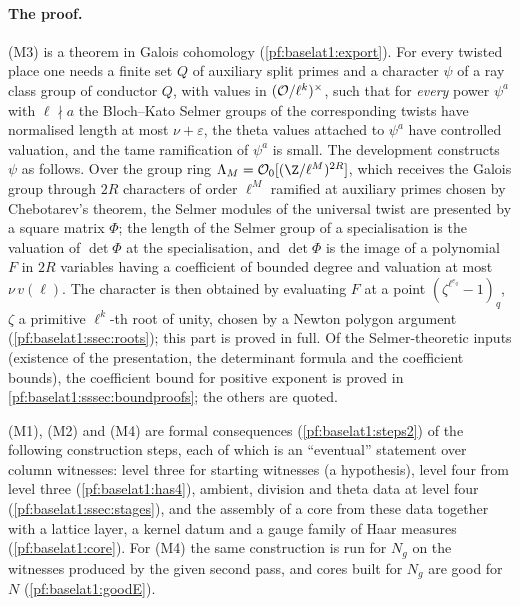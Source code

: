 \paragraph{The proof.} (M3) is a theorem in Galois cohomology (\cref{pf:baselat1:export}). For every
twisted place one needs a finite set $Q$ of auxiliary split primes and a character $\psi$ of a ray class
group of conductor $Q$, with values in $(\mathcal O/\ell^{k})^\times$, such that for \emph{every} power
$\psi^a$ with $\ell\nmid a$ the Bloch--Kato Selmer groups of the corresponding twists have normalised
length at most $\nu+\varepsilon$, the theta values attached to $\psi^a$ have controlled valuation, and the
tame ramification of $\psi^a$ is small. The development constructs $\psi$ as follows. Over the group ring
$\baselatoneLam_M=\baselatoneO_0[(\Z/\ell^M)^{2R}]$, which receives the Galois group through $2R$
characters of order $\ell^M$ ramified at auxiliary primes chosen by Chebotarev's theorem, the Selmer
modules of the universal twist are presented by a square matrix $\Phi$; the length of the Selmer group of a
specialisation is the valuation of $\det\Phi$ at the specialisation, and $\det\Phi$ is the image of a
polynomial $F$ in $2R$ variables having a coefficient of bounded degree and valuation at most
$\nu\, v(\ell)$. The character is then obtained by evaluating $F$ at a
point $(\zeta^{\ell^{e_q}}-1)_q$, $\zeta$ a primitive $\ell^k$-th root of unity, chosen by a Newton polygon
argument (\cref{pf:baselat1:ssec:roots}); this part is proved in full. Of the Selmer-theoretic inputs (existence
of the presentation, the determinant formula and the coefficient bounds), the coefficient bound for positive
exponent is proved in \cref{pf:baselat1:sssec:boundproofs}; the others are quoted.

(M1), (M2) and (M4) are formal consequences (\cref{pf:baselat1:steps2}) of the following construction
steps, each of which is an ``eventual'' statement over column witnesses: level three for starting witnesses
(a hypothesis), level four from level three (\cref{pf:baselat1:has4}), ambient, division and theta data at
level four (\cref{pf:baselat1:ssec:stages}), and the assembly of a core from these data together with a
lattice layer, a kernel datum and a gauge family of Haar measures (\cref{pf:baselat1:core}). For (M4) the
same construction is run for $N_g$ on the witnesses produced by the given second pass, and cores built for
$N_g$ are good for $N$ (\cref{pf:baselat1:goodE}).

